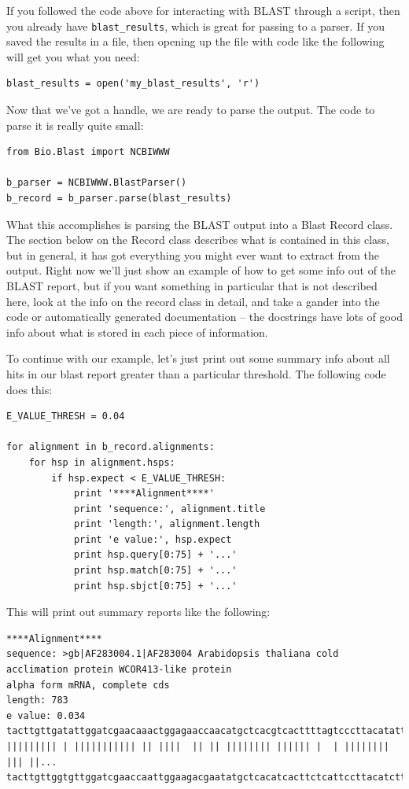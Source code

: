 \documentclass{report}
\begin{document}
If you followed the code above for interacting with BLAST through a
script, then you already have \verb|blast_results|, which is great for
passing to a parser. If you saved the results in a file, then opening
up the file with code like the following will get you what you need:


\begin{verbatim}
blast_results = open('my_blast_results', 'r')
\end{verbatim}


Now that we've got a handle, we are ready to parse the output. The
code to parse it is really quite small:


\begin{verbatim}
from Bio.Blast import NCBIWWW

b_parser = NCBIWWW.BlastParser()
b_record = b_parser.parse(blast_results)
\end{verbatim}

What this accomplishes is parsing the BLAST output into a Blast Record
class. The section below on the Record class describes what is
contained in this class, but in general, it has got everything you
might ever want to extract from the output. Right now we'll just show
an example of how to get some info out of the BLAST report, but if you
want something in particular that is not described here, look at the
info on the record class in detail, and take a gander into the code or
automatically generated documentation -- the docstrings have lots of
good info about what is stored in each piece of information.


To continue with our example, let's just print out some summary info
about all hits in our blast report greater than a particular
threshold. The following code does this:

\begin{verbatim}
E_VALUE_THRESH = 0.04

for alignment in b_record.alignments:
    for hsp in alignment.hsps:
        if hsp.expect < E_VALUE_THRESH:
            print '****Alignment****'
            print 'sequence:', alignment.title
            print 'length:', alignment.length
            print 'e value:', hsp.expect
            print hsp.query[0:75] + '...'
            print hsp.match[0:75] + '...'
            print hsp.sbjct[0:75] + '...'
\end{verbatim}

This will print out summary reports like the following:

\begin{verbatim}
****Alignment****
sequence: >gb|AF283004.1|AF283004 Arabidopsis thaliana cold acclimation protein WCOR413-like protein
alpha form mRNA, complete cds
length: 783
e value: 0.034
tacttgttgatattggatcgaacaaactggagaaccaacatgctcacgtcacttttagtcccttacatattcctc...
||||||||| | ||||||||||| || ||||  || || |||||||| |||||| |  | |||||||| ||| ||...
tacttgttggtgttggatcgaaccaattggaagacgaatatgctcacatcacttctcattccttacatcttcttc...
\end{verbatim}
\end{document}
